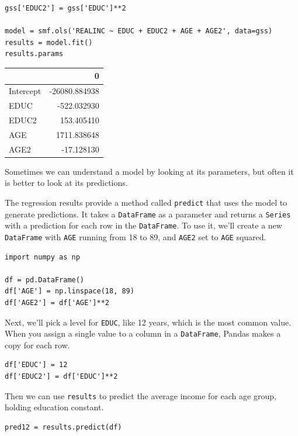 \begin{lstlisting}[]
gss['EDUC2'] = gss['EDUC']**2

model = smf.ols('REALINC ~ EDUC + EDUC2 + AGE + AGE2', data=gss)
results = model.fit()
results.params
\end{lstlisting}

\begin{tabular}{lr}
\midrule
{} &             0 \\
\midrule
Intercept & -26080.884938 \\
EDUC      &   -522.032930 \\
EDUC2     &    153.405410 \\
AGE       &   1711.838648 \\
AGE2      &    -17.128130 \\
\midrule
\end{tabular}

Sometimes we can understand a model by looking at its parameters, but
often it is better to look at its predictions.

The regression results provide a method called
\passthrough{\lstinline!predict!} that uses the model to generate
predictions. It takes a \passthrough{\lstinline!DataFrame!} as a
parameter and returns a \passthrough{\lstinline!Series!} with a
prediction for each row in the \passthrough{\lstinline!DataFrame!}. To
use it, we'll create a new \passthrough{\lstinline!DataFrame!} with
\passthrough{\lstinline!AGE!} running from 18 to 89, and
\passthrough{\lstinline!AGE2!} set to \passthrough{\lstinline!AGE!}
squared.

\begin{lstlisting}[]
import numpy as np

df = pd.DataFrame()
df['AGE'] = np.linspace(18, 89)
df['AGE2'] = df['AGE']**2
\end{lstlisting}

Next, we'll pick a level for \passthrough{\lstinline!EDUC!}, like 12
years, which is the most common value. When you assign a single value to
a column in a \passthrough{\lstinline!DataFrame!}, Pandas makes a copy
for each row.

\begin{lstlisting}[]
df['EDUC'] = 12
df['EDUC2'] = df['EDUC']**2
\end{lstlisting}

Then we can use \passthrough{\lstinline!results!} to predict the average
income for each age group, holding education constant.

\begin{lstlisting}[]
pred12 = results.predict(df)
\end{lstlisting}


